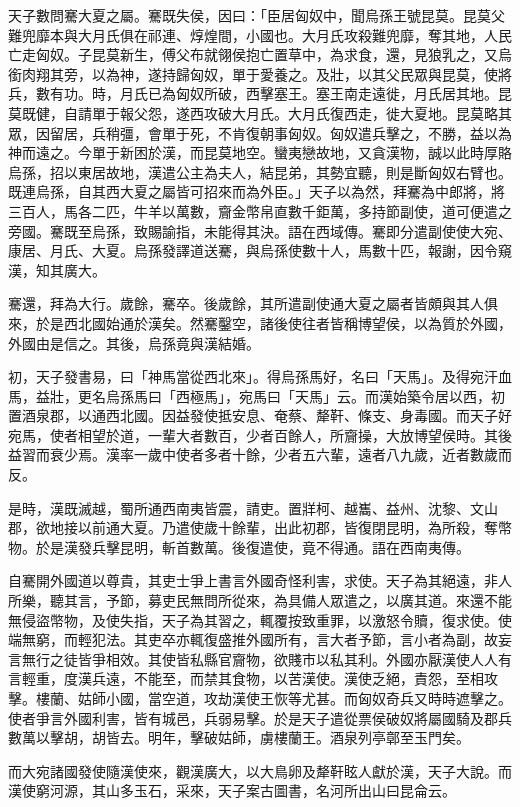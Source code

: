 \begin{pinyinscope}
天子數問騫大夏之屬。騫既失侯，因曰：「臣居匈奴中，聞烏孫王號昆莫。昆莫父難兜靡本與大月氏俱在祁連、焞煌間，小國也。大月氏攻殺難兜靡，奪其地，人民亡走匈奴。子昆莫新生，傅父布就翎侯抱亡置草中，為求食，還，見狼乳之，又烏銜肉翔其旁，以為神，遂持歸匈奴，單于愛養之。及壯，以其父民眾與昆莫，使將兵，數有功。時，月氏已為匈奴所破，西擊塞王。塞王南走遠徙，月氏居其地。昆莫既健，自請單于報父怨，遂西攻破大月氏。大月氏復西走，徙大夏地。昆莫略其眾，因留居，兵稍彊，會單于死，不肯復朝事匈奴。匈奴遣兵擊之，不勝，益以為神而遠之。今單于新困於漢，而昆莫地空。蠻夷戀故地，又貪漢物，誠以此時厚賂烏孫，招以東居故地，漢遣公主為夫人，結昆弟，其勢宜聽，則是斷匈奴右臂也。既連烏孫，自其西大夏之屬皆可招來而為外臣。」天子以為然，拜騫為中郎將，將三百人，馬各二匹，牛羊以萬數，齎金幣帛直數千鉅萬，多持節副使，道可便遣之旁國。騫既至烏孫，致賜諭指，未能得其決。語在西域傳。騫即分遣副使使大宛、康居、月氏、大夏。烏孫發譯道送騫，與烏孫使數十人，馬數十匹，報謝，因令窺漢，知其廣大。

騫還，拜為大行。歲餘，騫卒。後歲餘，其所遣副使通大夏之屬者皆頗與其人俱來，於是西北國始通於漢矣。然騫鑿空，諸後使往者皆稱博望侯，以為質於外國，外國由是信之。其後，烏孫竟與漢結婚。

初，天子發書易，曰「神馬當從西北來」。得烏孫馬好，名曰「天馬」。及得宛汗血馬，益壯，更名烏孫馬曰「西極馬」，宛馬曰「天馬」云。而漢始築令居以西，初置酒泉郡，以通西北國。因益發使抵安息、奄蔡、犛靬、條支、身毒國。而天子好宛馬，使者相望於道，一輩大者數百，少者百餘人，所齎操，大放博望侯時。其後益習而衰少焉。漢率一歲中使者多者十餘，少者五六輩，遠者八九歲，近者數歲而反。

是時，漢既滅越，蜀所通西南夷皆震，請吏。置牂柯、越巂、益州、沈黎、文山郡，欲地接以前通大夏。乃遣使歲十餘輩，出此初郡，皆復閉昆明，為所殺，奪幣物。於是漢發兵擊昆明，斬首數萬。後復遣使，竟不得通。語在西南夷傳。

自騫開外國道以尊貴，其吏士爭上書言外國奇怪利害，求使。天子為其絕遠，非人所樂，聽其言，予節，募吏民無問所從來，為具備人眾遣之，以廣其道。來還不能無侵盜幣物，及使失指，天子為其習之，輒覆按致重罪，以激怒令贖，復求使。使端無窮，而輕犯法。其吏卒亦輒復盛推外國所有，言大者予節，言小者為副，故妄言無行之徒皆爭相效。其使皆私縣官齎物，欲賤市以私其利。外國亦厭漢使人人有言輕重，度漢兵遠，不能至，而禁其食物，以苦漢使。漢使乏絕，責怨，至相攻擊。樓蘭、姑師小國，當空道，攻劫漢使王恢等尤甚。而匈奴奇兵又時時遮擊之。使者爭言外國利害，皆有城邑，兵弱易擊。於是天子遣從票侯破奴將屬國騎及郡兵數萬以擊胡，胡皆去。明年，擊破姑師，虜樓蘭王。酒泉列亭鄣至玉門矣。

而大宛諸國發使隨漢使來，觀漢廣大，以大鳥卵及犛靬眩人獻於漢，天子大說。而漢使窮河源，其山多玉石，采來，天子案古圖書，名河所出山曰昆侖云。


\end{pinyinscope}
